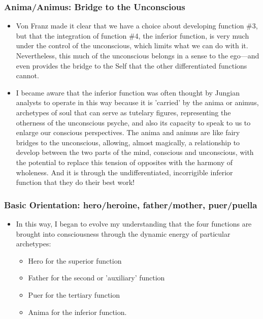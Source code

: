 \subsubsection{Anima/Animus: Bridge to the Unconscious}

\begin{itemize}

\item
Von Franz made it clear that we have a choice about developing function \#3,
but that the integration of function \#4, the inferior function, is very much
under the control of the unconscious, which limits what we can do with it.
Nevertheless, this much of the unconscious belongs in a sense to the ego—and
even provides the bridge to the Self that the other differentiated functions
cannot.

\item
I became aware that the inferior function was often thought by Jungian analysts
to operate in this way because it is 'carried' by the anima or animus,
archetypes of soul that can serve as tutelary figures, representing the
otherness of the unconscious psyche, and also its capacity to speak to us to
enlarge our conscious perspectives. The anima and animus are like fairy bridges
to the unconscious, allowing, almost magically, a relationship to develop
between the two parts of the mind, conscious and unconscious, with the
potential to replace this tension of opposites with the harmony of wholeness.
And it is through the undifferentiated, incorrigible inferior function that
they do their best work!
\end{itemize}

\subsubsection{Basic Orientation: hero/heroine, father/mother, puer/puella}

\begin{itemize}

\item In this way, I began to evolve my understanding that the four functions are
brought into consciousness through the dynamic energy of particular archetypes:%
\begin{itemize}
\item Hero for the superior function
\item Father for the second or 'auxiliary' function
\item Puer for the tertiary function
\item Anima for the inferior function.
\end{itemize}

\end{itemize}

